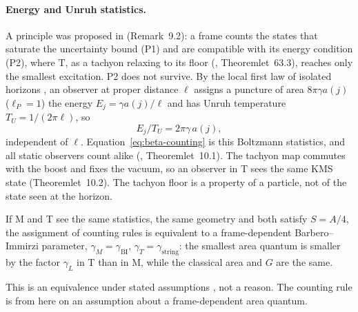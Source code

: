 \paragraph{Energy and Unruh statistics.}
A principle was proposed in  (Remark~9.2): a frame counts the states that saturate the uncertainty bound (P1) and are compatible with
its energy condition (P2), where T, as a tachyon relaxing to its floor (, Theoremlet~63.3), reaches only the smallest excitation.  P2 does
not survive.  By the local first law of isolated horizons \cite{FroddenGhoshPerez2013}, an observer at proper distance $\ell$ assigns a puncture of
area $8\pi\gamma a(j)$ ($\ell_P=1$) the energy $E_j=\gamma a(j)/\ell$ and has Unruh temperature $T_U=1/(2\pi\ell)$, so
\begin{equation}
 E_j/T_U=2\pi\gamma\,a(j),
 \label{eq:beta-unruh}
\end{equation}
independent of $\ell$.  Equation~\eqref{eq:beta-counting} is this Boltzmann statistics, and all static observers count alike (,
Theoremlet~10.1).  The tachyon map commutes with the boost and fixes the vacuum, so an observer in T sees the same KMS state (Theoremlet~10.2).  The
tachyon floor is a property of a particle, not of the state seen at the horizon.

\begin{proposition}
\label{prop:beta-area}
If M and T see the same statistics, the same geometry and both satisfy $S=A/4$, the assignment of counting rules is equivalent to a
frame-dependent Barbero--Immirzi parameter, $\gamma_M=\gamma_{\mathrm{BI}}$, $\gamma_T=\gamma_{\mathrm{string}}$: the smallest area quantum is smaller
by the factor $\gamma_L$ in T than in M, while the classical area and $G$ are the same.
\end{proposition}

This is an equivalence under stated assumptions \Conditional, not a reason.  The counting rule is from here on an assumption about a
frame-dependent area quantum.

